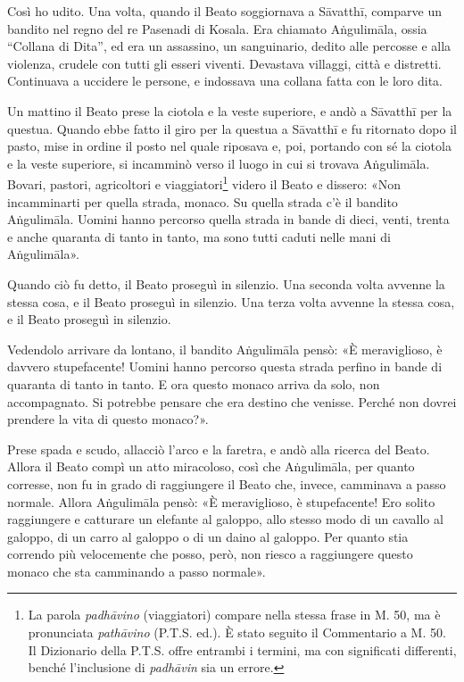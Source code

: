  Così ho udito. Una volta, quando il Beato soggiornava a
Sāvatthī, comparve un bandito nel regno del re Pasenadi di Kosala. Era chiamato
Aṅgulimāla, ossia “Collana di Dita”, ed era un assassino, un sanguinario, dedito
alle percosse e alla violenza, crudele con tutti gli esseri viventi. Devastava
villaggi, città e distretti. Continuava a uccidere le persone, e indossava una
collana fatta con le loro dita.

Un mattino il Beato prese la ciotola e la veste superiore, e andò a Sāvatthī per
la questua. Quando ebbe fatto il giro per la questua a Sāvatthī e fu ritornato
dopo il pasto, mise in ordine il posto nel quale riposava e, poi, portando con
sé la ciotola e la veste superiore, si incamminò verso il luogo in cui si
trovava Aṅgulimāla. Bovari, pastori, agricoltori e viaggiatori\footnote{La
  parola \emph{padhāvino} (viaggiatori) compare nella stessa frase in M. 50, ma
  è pronunciata \emph{pathāvino} (P.T.S. ed.). È stato seguito il Commentario a
  M. 50. Il Dizionario della P.T.S. offre entrambi i termini, ma con significati
  differenti, benché l’inclusione di \emph{padhāvin} sia un errore.} videro il
Beato e dissero: «Non incamminarti per quella strada, monaco. Su quella strada
c’è il bandito Aṅgulimāla. Uomini hanno percorso quella strada in bande di
dieci, venti, trenta e anche quaranta di tanto in tanto, ma sono tutti caduti
nelle mani di Aṅgulimāla».

Quando ciò fu detto, il Beato proseguì in silenzio. Una seconda volta avvenne la
stessa cosa, e il Beato proseguì in silenzio. Una terza volta avvenne la stessa
cosa, e il Beato proseguì in silenzio.

Vedendolo arrivare da lontano, il bandito Aṅgulimāla pensò: «È meraviglioso, è
davvero stupefacente! Uomini hanno percorso questa strada perfino in bande di
quaranta di tanto in tanto. E ora questo monaco arriva da solo, non
accompagnato. Si potrebbe pensare che era destino che venisse. Perché non dovrei
prendere la vita di questo monaco?».

Prese spada e scudo, allacciò l’arco e la faretra, e andò alla ricerca del
Beato. Allora il Beato compì un atto miracoloso, così che Aṅgulimāla, per quanto
corresse, non fu in grado di raggiungere il Beato che, invece, camminava a passo
normale. Allora Aṅgulimāla pensò: «È meraviglioso, è stupefacente! Ero solito
raggiungere e catturare un elefante al galoppo, allo stesso modo di un cavallo
al galoppo, di un carro al galoppo o di un daino al galoppo. Per quanto stia
correndo più velocemente che posso, però, non riesco a raggiungere questo monaco
che sta camminando a passo normale».

